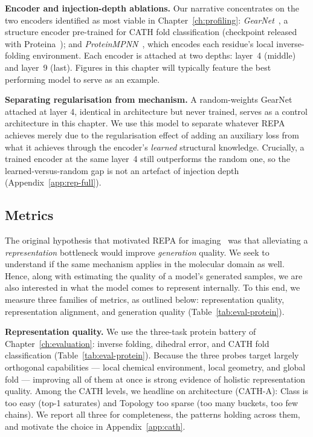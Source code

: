\documentclass[12pt,a4paper,twoside]{report}
\begin{document}


\textbf{Encoder and injection-depth ablations.} Our narrative concentrates on the two encoders identified as most viable in Chapter~\ref{ch:profiling}: \emph{GearNet}~\cite{GearNet}, a structure encoder pre-trained for CATH fold classification (checkpoint released with Proteina~\cite{Proteina}); and \emph{ProteinMPNN}~\cite{ProteinMPNN}, which encodes each residue's local inverse-folding environment. Each encoder is attached at two depths: layer~4 (middle) and layer~9 (last). Figures in this chapter will typically feature the best performing model to serve as an example.

\textbf{Separating regularisation from mechanism.} A random-weights GearNet attached at layer 4, identical in architecture but never trained, serves as a control architecture in this chapter. We use this model to separate whatever REPA achieves merely due to the regularisation effect of adding an auxiliary loss from what it achieves through the encoder's \emph{learned} structural knowledge. Crucially, a trained encoder at the same layer~4 still outperforms the random one, so the learned-versus-random gap is not an artefact of injection depth (Appendix~\ref{app:rep-full}).



\subsection{Metrics}
\label{sec:proteina-metrics}

The original hypothesis that motivated REPA for imaging~\cite{REPA} was that alleviating a \emph{representation} bottleneck would improve \emph{generation} quality. We seek to understand if the same mechanism applies in the molecular domain as well. Hence, along with estimating the quality of a model's generated samples, we are also interested in what the model comes to represent internally. To this end, we measure three families of metrics, as outlined below: representation quality, representation alignment, and generation quality (Table~\ref{tab:eval-protein}).

\textbf{Representation quality.} We use the three-task protein battery of Chapter~\ref{ch:evaluation}: inverse folding, dihedral error, and CATH fold classification (Table~\ref{tab:eval-protein}). Because the three probes target largely orthogonal capabilities --- local chemical environment, local geometry, and global fold --- improving all of them at once is strong evidence of holistic representation quality. Among the CATH levels, we headline on architecture (CATH-A): Class is too easy (top-1 saturates) and Topology too sparse (too many buckets, too few chains). We report all three for completeness, the patterns holding across them, and motivate the choice in Appendix~\ref{app:cath}.
\end{document}
